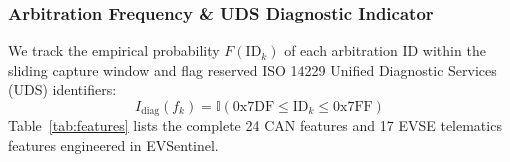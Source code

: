 \documentclass[conference]{IEEEtran}
\begin{document}
\subsubsection{Arbitration Frequency \& UDS Diagnostic Indicator}
We track the empirical probability $F(\text{ID}_k)$ of each arbitration ID within the sliding capture window and flag reserved ISO 14229 Unified Diagnostic Services (UDS) identifiers:
\begin{equation}
    I_{\text{diag}}(f_k) = \mathbb{I}\left( 0\text{x}7\text{DF} \le \text{ID}_k \le 0\text{x}7\text{FF} \right)
\end{equation}
Table~\ref{tab:features} lists the complete 24 CAN features and 17 EVSE telematics features engineered in EVSentinel.

\end{document}
